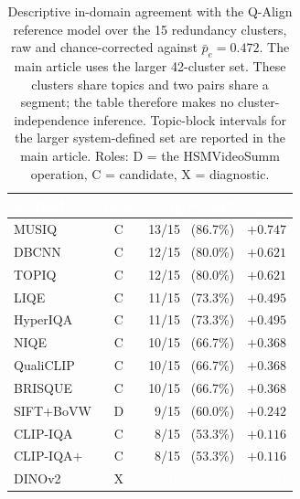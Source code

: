 \documentclass[sn-basic,Numbered]{sn-jnl}
\newcommand{\pfB}[1]{\cellcolor{perf4}#1}
\newcommand{\pfC}[1]{\cellcolor{perf3}#1}
\newcommand{\pfD}[1]{\cellcolor{perf2}#1}
\newcommand{\pfE}[1]{\cellcolor{perf1}\textcolor{white}{#1}}
\newcommand{\hd}[1]{\textcolor{white}{\textbf{#1}}}
\begin{document}
\begin{table}[!ht]
\centering
\caption{Descriptive in-domain agreement with the Q-Align reference model over
the 15 redundancy clusters, raw and chance-corrected against
$\bar{p}_e = 0.472$. The main article uses the larger 42-cluster set. These clusters
share topics and two
pairs share a segment;
the table therefore makes no cluster-independence inference. Topic-block
intervals for the larger system-defined set are reported in the main article.
Roles: D = the HSMVideoSumm operation, C = candidate, X = diagnostic.}
\label{tab:agree}
\small
\setlength{\tabcolsep}{6pt}
\renewcommand{\arraystretch}{1.14}
\begin{tabular}{@{}l c r r@{}}
\toprule
\rowcolor{headerblue}
\hd{Method} & \hd{Role} & \hd{Agreement} & \hd{$\kappa_{\mathrm{uniform}}$} \\
\midrule
\rowcolor{rowlight} MUSIQ     & C & \pfB{13/15 \ (86.7\%)} & \pfB{$+0.747$} \\
\rowcolor{rowwhite} DBCNN     & C & \pfB{12/15 \ (80.0\%)} & \pfB{$+0.621$} \\
\rowcolor{rowlight} TOPIQ     & C & \pfB{12/15 \ (80.0\%)} & \pfB{$+0.621$} \\
\rowcolor{rowwhite} LIQE      & C & \pfB{11/15 \ (73.3\%)} & \pfB{$+0.495$} \\
\rowcolor{rowlight} HyperIQA  & C & \pfB{11/15 \ (73.3\%)} & \pfB{$+0.495$} \\
\rowcolor{rowwhite} NIQE      & C & \pfC{10/15 \ (66.7\%)} & \pfC{$+0.368$} \\
\rowcolor{rowlight} QualiCLIP & C & \pfC{10/15 \ (66.7\%)} & \pfC{$+0.368$} \\
\rowcolor{rowwhite} BRISQUE   & C & \pfC{10/15 \ (66.7\%)} & \pfC{$+0.368$} \\
\rowcolor{rowlight} SIFT+BoVW & D & \pfD{\ \,9/15 \ (60.0\%)} & \pfD{$+0.242$} \\
\rowcolor{rowwhite} CLIP-IQA  & C & \pfD{\ \,8/15 \ (53.3\%)} & \pfD{$+0.116$} \\
\rowcolor{rowlight} CLIP-IQA$+$ & C & \pfD{\ \,8/15 \ (53.3\%)} & \pfD{$+0.116$} \\
\rowcolor{rowwhite} DINOv2    & X & \pfE{\ \,5/15 \ (33.3\%)} & \pfE{$-0.263$} \\
\bottomrule
\end{tabular}
\end{table}
\end{document}
